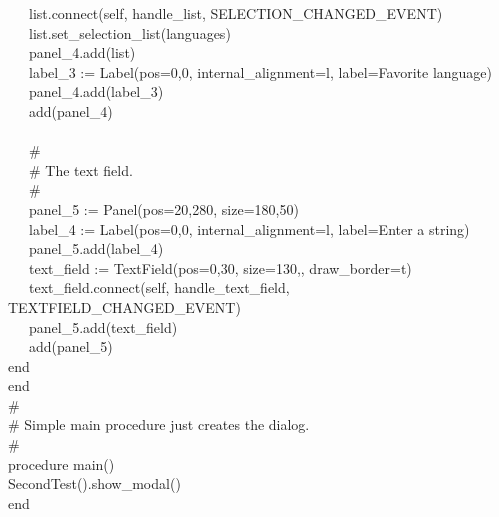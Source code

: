 {\>   \ \ \ list.connect(self,
{\textquotedbl}handle\_list{\textquotedbl}, SELECTION\_CHANGED\_EVENT) \\
\>   \ \ \ list.set\_selection\_list(languages) \\
\>   \ \ \ panel\_4.add(list) \\
\>   \ \ \ label\_3 := Label({\textquotedbl}pos=0,0{\textquotedbl},
{\textquotedbl}internal\_alignment=l{\textquotedbl},
{\textquotedbl}label=Favorite language{\textquotedbl}) \\
\>   \ \ \ panel\_4.add(label\_3) \\
\>   \ \ \ add(panel\_4) \\
\ \\
\>   \ \ \ \# \\
\>   \ \ \ \# The text field. \\
\>   \ \ \ \# \\
\>   \ \ \ panel\_5 := Panel({\textquotedbl}pos=20,280{\textquotedbl},
{\textquotedbl}size=180,50{\textquotedbl}) \\
\>   \ \ \ label\_4 := Label({\textquotedbl}pos=0,0{\textquotedbl},
{\textquotedbl}internal\_alignment=l{\textquotedbl},
{\textquotedbl}label=Enter a string{\textquotedbl}) \\
\>   \ \ \ panel\_5.add(label\_4) \\
\>   \ \ \ text\_field :=
TextField({\textquotedbl}pos=0,30{\textquotedbl},
{\textquotedbl}size=130,{\textquotedbl},
{\textquotedbl}draw\_border=t{\textquotedbl}) \\
\>   \ \ \ text\_field.connect(self,
{\textquotedbl}handle\_text\_field{\textquotedbl},
TEXTFIELD\_CHANGED\_EVENT) \\
\>   \ \ \ panel\_5.add(text\_field) \\
\>   \ \ \ add(panel\_5) \\
\>   end \\
end \\
\# \\
\# Simple main procedure just creates the dialog. \\
\# \\
procedure main() \\
\>   SecondTest().show\_modal() \\
end
}


